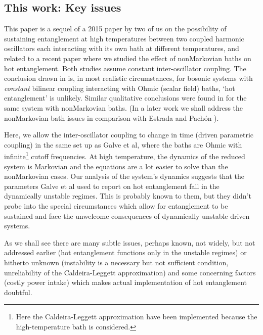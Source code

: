 \documentclass[11pt,a4paper]{article}
\begin{document}
\subsection{This work: Key issues}

This paper is a sequel of a 2015 paper by two of us \cite{HH15JHEP} on  the possibility of sustaining entanglement at  high temperatures between two coupled harmonic oscillators each interacting with its own bath at different temperatures, and related to a  recent paper \cite{HAH22} where we studied the effect of nonMarkovian baths on hot entanglement. Both studies assume constant inter-oscillator coupling. The conclusion drawn in \cite{HH15JHEP} is, in most realistic circumstances, for bosonic systems with \textit{constant} bilinear coupling interacting with  Ohmic (scalar field) baths, `hot entanglement' is unlikely. Similar qualitative conclusions were found in \cite{HAH22} for the same system with nonMarkovian baths. (In a later work \cite{AHH-nM} we shall address the nonMarkovian bath issues in comparison with Estrada and Pach\'on \cite{EstPac}). 

Here, we allow  the inter-oscillator coupling to change in time (driven parametric coupling) in the same set up as Galve et al, where the baths are Ohmic with infinite\footnote{{Here the Caldeira-Leggett approximation have been implemented because the high-temperature bath is considered.}} cutoff frequencies. At high temperature, the dynamics of the reduced system  is Markovian and the equations are a lot easier to solve than the nonMarkovian cases. 
Our analysis of the system's dynamics suggests that the parameters Galve et al used to report on hot entanglement fall in the dynamically unstable regimes. This is probably known to them, but they didn't probe into the special circumstances which allow for entanglement to be sustained and face the unwelcome consequences of dynamically unstable driven systems.

As we shall see there are many subtle issues, perhaps known, not widely,  but not addressed earlier (hot entanglement functions only in the unstable regimes) or hitherto unknown (instability is a necessary but not sufficient condition, {unreliability} of the Caldeira-Leggett approximation) and some concerning factors (costly power intake) which makes actual implementation of hot entanglement doubtful. 
	
\end{document}
